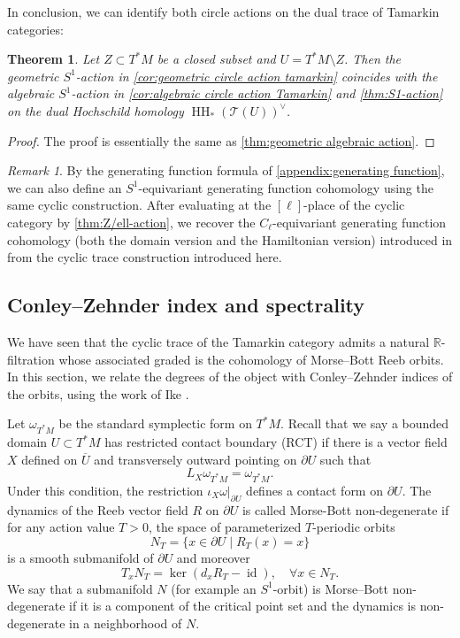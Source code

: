 \documentclass[11pt]{amsart}
\numberwithin{equation}{section}
\theoremstyle{plain}
\newtheorem{Thm}{Theorem}[section]
\theoremstyle{definition}
\theoremstyle{remark}
\newtheorem{RMK}[rmk]{Remark}
\newcommand{\bR} { {\mathbb{R}}}
\newcommand{\sT} { {\mathscr{T}}}
\newcommand{\id}{{\operatorname{id}}}
\newcommand\HH{\operatorname{HH}}
\begin{document}
In conclusion, we can identify both circle actions on the dual trace of Tamarkin categories:

\begin{Thm}\label{thm: geometric circle tamarkin}
Let $Z \subset T^*M$ be a closed subset and $U = T^*M \setminus Z$. Then the geometric $S^1$-action in \autoref{cor:geometric circle action tamarkin} coincides with the algebraic $S^1$-action in \autoref{cor:algebraic circle action Tamarkin} and \autoref{thm:S1-action} \cite[Theorem 1.5]{Li-Zhang26-1} on the dual Hochschild homology $\HH_*(\sT(U))^\vee$.
\end{Thm}
\begin{proof}
The proof is essentially the same as \autoref{thm:geometric algebraic action}.
\end{proof}

\begin{RMK}By the generating function formula of \autoref{appendix:generating function}, we can also define an $S^1$-equivariant generating function cohomology using the same cyclic construction.   After evaluating at the $[\ell]$-place of the cyclic category by \autoref{thm:Z/ell-action}, we recover the $C_\ell$-equivariant generating function cohomology (both the domain version and the Hamiltonian version) introduced in \cite{large_non_equeezing_GF} from the cyclic trace construction introduced here.
\end{RMK}










\subsection{Conley--Zehnder index and spectrality}\label{section:CZ index and spectrality}
We have seen that the cyclic trace of the Tamarkin category admits a natural $\bR$-filtration whose associated graded is the cohomology of Morse--Bott Reeb orbits. In this section, we relate the degrees of the object with Conley--Zehnder indices of the orbits, using the work of Ike \cite[Section 4.4]{Ike_2019}.

Let $\omega_{T^*M}$ be the standard symplectic form on $T^*M$. Recall that we say a bounded domain $U \subset T^*M$ has restricted contact boundary (RCT) if there is a vector field $X$ defined on $\overline{U}$ and transversely outward pointing on $\partial U$  such that \[L_X\omega_{T^*M} = \omega_{T^*M}.\]
Under this condition, the restriction $\iota_X\omega|_{\partial U}$ defines a contact form on $\partial U$. The dynamics of the Reeb vector field $R$ on $\partial U$ is called Morse-Bott non-degenerate if for any action value $T>0$, the space of parameterized $T$-periodic orbits
\[N_T=\{x\in \partial U\mid R_T(x)=x\}\]
is a smooth submanifold of $\partial U$ and moreover
\[T_xN_T=\ker(d_xR_T-\id),\quad \forall x\in N_T.\]
We say that a submanifold $N$ (for example an $S^1$-orbit) is Morse--Bott non-degenerate if it is a component of the critical point set and the dynamics is non-degenerate in a neighborhood of $N$.
\end{document}
